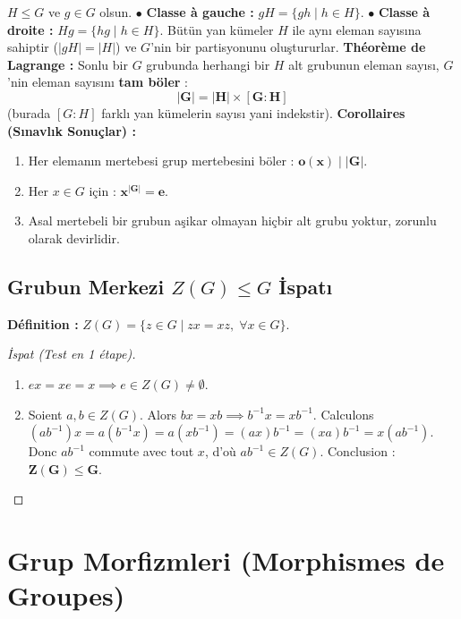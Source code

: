 \documentclass[11pt,a4paper]{article}
\begin{document}
\begin{tcolorbox}[colback=teal!5!white,colframe=teal!80!black,title=Yan Kümeler (Cosets) ve Théorème de Lagrange]
$H \leq G$ ve $g \in G$ olsun.  
$\bullet$ \textbf{Classe à gauche :} $gH = \{ gh \mid h \in H \}$.  
$\bullet$ \textbf{Classe à droite :} $Hg = \{ hg \mid h \in H \}$.  
Bütün yan kümeler $H$ ile aynı eleman sayısına sahiptir ($|gH| = |H|$) ve $G$'nin bir partisyonunu oluştururlar.  
\textbf{Théorème de Lagrange :} Sonlu bir $G$ grubunda herhangi bir $H$ alt grubunun eleman sayısı, $G$'nin eleman sayısını \textbf{tam böler} :
\[ \mathbf{|G| = |H| \times [G : H]} \]
(burada $[G:H]$ farklı yan kümelerin sayısı yani indekstir).  
\textbf{Corollaires (Sınavlık Sonuçlar) :}
\begin{enumerate}
    \item Her elemanın mertebesi grup mertebesini böler : $\mathbf{o(x) \mid |G|}$.
    \item Her $x \in G$ için : $\mathbf{x^{|G|} = e}$.
    \item Asal mertebeli bir grubun aşikar olmayan hiçbir alt grubu yoktur, zorunlu olarak devirlidir.
\end{enumerate}
\end{tcolorbox}

\subsection*{Grubun Merkezi $Z(G) \leq G$ İspatı}
\textbf{Définition :} $Z(G) = \{ z \in G \mid zx = xz, \; \forall x \in G \}$.
\begin{proof}[İspat (Test en 1 étape)]
\begin{enumerate}
    \item $ex = xe = x \implies e \in Z(G) \neq \emptyset$.
    \item Soient $a, b \in Z(G)$. Alors $bx = xb \implies b^{-1}x = xb^{-1}$.  
    Calculons $(ab^{-1})x = a(b^{-1}x) = a(xb^{-1}) = (ax)b^{-1} = (xa)b^{-1} = x(ab^{-1})$.  
    Donc $ab^{-1}$ commute avec tout $x$, d'où $ab^{-1} \in Z(G)$.  
    Conclusion : $\mathbf{Z(G) \leq G}$.
\end{enumerate}
\end{proof}

\vspace{0.5cm}

\section{Grup Morfizmleri (Morphismes de Groupes)}
\end{document}
